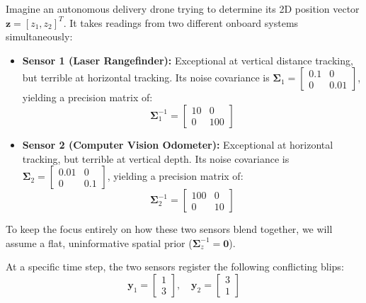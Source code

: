 \documentclass{article}
\begin{document}
Imagine an autonomous delivery drone trying to determine its 2D position vector $\mathbf{z} = [z_1, z_2]^T$. It takes readings from two different onboard systems simultaneously:
\begin{itemize}
    \item \textbf{Sensor 1 (Laser Rangefinder):} Exceptional at vertical distance tracking, but terrible at horizontal tracking. Its noise covariance is $\boldsymbol{\Sigma}_1 = \begin{bmatrix} 0.1 & 0 \\ 0 & 0.01 \end{bmatrix}$, yielding a precision matrix of:
    \begin{equation*}
    \boldsymbol{\Sigma}_1^{-1} = \begin{bmatrix} 10 & 0 \\ 0 & 100 \end{bmatrix}
    \end{equation*}
    \item \textbf{Sensor 2 (Computer Vision Odometer):} Exceptional at horizontal tracking, but terrible at vertical depth. Its noise covariance is $\boldsymbol{\Sigma}_2 = \begin{bmatrix} 0.01 & 0 \\ 0 & 0.1 \end{bmatrix}$, yielding a precision matrix of:
    \begin{equation*}
    \boldsymbol{\Sigma}_2^{-1} = \begin{bmatrix} 100 & 0 \\ 0 & 10 \end{bmatrix}
    \end{equation*}
\end{itemize}

To keep the focus entirely on how these two sensors blend together, we will assume a flat, uninformative spatial prior ($\boldsymbol{\Sigma}_z^{-1} = \mathbf{0}$). 

At a specific time step, the two sensors register the following conflicting blips:
\begin{equation*}
\mathbf{y}_1 = \begin{bmatrix} 1 \\ 3 \end{bmatrix}, \quad \mathbf{y}_2 = \begin{bmatrix} 3 \\ 1 \end{bmatrix}
\end{equation*}
\end{document}
